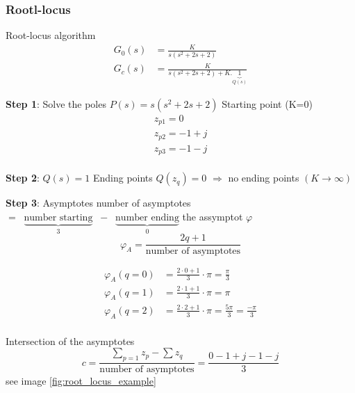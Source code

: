 \documentclass{article}
\begin{document}
\subsubsection{Rootl-locus}

\begin{exampleblock}{Root-locus algorithm}
    \begin{align*}
        G_0(s) &= \frac{K}{s(s^2 + 2s + 2)} \\
        G_c(s) &= \frac{K}{s(s^2 + 2s + 2) + K.\underbrace{1}_{Q(s)} }
    \end{align*}

    \textbf{Step 1}: Solve the poles $P(s) = s(s^2 + 2s + 2)$
    Starting point (K=0)
    \begin{align*}
        z_{p1} = 0 \\
        z_{p2} = -1+j \\
        z_{p3} = -1-j \\
    \end{align*}

    \textbf{Step 2}: $Q(s) = 1$ 
    Ending points $Q(z_q) = 0$ $\Rightarrow$ no ending points $(K\to\infty)$

    \textbf{Step 3}: Asymptotes
    number of asymptotes $= \;\; \underbrace{\text{number starting}}_{3} \;\; - \;\; \underbrace{\text{number ending}}_{0}$
    the assymptot $\varphi$ 
    \begin{equation*}
        \varphi_A = \frac{2q + 1}{\text{number of asymptotes}}
    \end{equation*}

    \begin{align*}
        \varphi_A(q=0) &= \frac{2\cdot 0 + 1}{3}\cdot\pi = \frac{\pi}{3} \\
        \varphi_A(q=1) &= \frac{2\cdot 1 + 1}{3}\cdot\pi = \pi \\
        \varphi_A(q=2) &= \frac{2\cdot 2 + 1}{3}\cdot\pi = \frac{5\pi}{3} = \frac{-\pi}{3} \\
    \end{align*}

    Intersection of the asymptotes
    \begin{equation*}
        c = \frac{\sum_{p=1} z_p - \sum z_q}{\text{number of asymptotes}} 
        = \frac{0-1+j-1-j}{3}
    \end{equation*}
    see image \ref{fig:root_locus_example}


\end{exampleblock}
\end{document}
